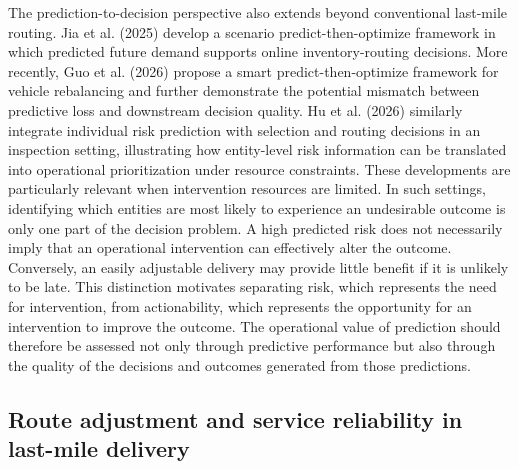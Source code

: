 \documentclass[11pt,a4paper]{article}
\begin{document}
The prediction-to-decision perspective also extends beyond conventional
last-mile routing. Jia et al. (2025) develop a scenario
predict-then-optimize framework in which predicted future demand
supports online inventory-routing decisions. More recently, Guo et al.
(2026) propose a smart predict-then-optimize framework for vehicle
rebalancing and further demonstrate the potential mismatch between
predictive loss and downstream decision quality. Hu et al. (2026)
similarly integrate individual risk prediction with selection and
routing decisions in an inspection setting, illustrating how
entity-level risk information can be translated into operational
prioritization under resource constraints. These developments are
particularly relevant when intervention resources are limited. In such
settings, identifying which entities are most likely to experience an
undesirable outcome is only one part of the decision problem. A high
predicted risk does not necessarily imply that an operational
intervention can effectively alter the outcome. Conversely, an easily
adjustable delivery may provide little benefit if it is unlikely to be
late. This distinction motivates separating risk, which represents the
need for intervention, from actionability, which represents the
opportunity for an intervention to improve the outcome. The operational
value of prediction should therefore be assessed not only through
predictive performance but also through the quality of the decisions and
outcomes generated from those predictions.

\subsection{Route adjustment and service reliability in last-mile delivery}\label{sec:lit-route-adjustment}
\end{document}
